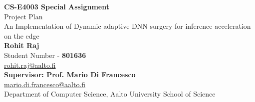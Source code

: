 \documentclass{article}
\begin{document}
	\begin{center}
    
    
		\LARGE{\textbf{CS-E4003 Special Assignment}} \\
		\Large{Project Plan} \\
        \vspace{1em}
        \Large{An Implementation of Dynamic adaptive DNN surgery for
        	inference acceleration on the edge} \\
        \vspace{1em}
        \normalsize\textbf{Rohit Raj} \\
        \normalsize{Student Number - \textbf{801636}} \\
        \normalsize{\href{mailto:rohit.raj@aalto.fi}{rohit.raj@aalto.fi}} \\
        \vspace{1em}
        \normalsize\textbf{Supervisor: Prof. Mario Di Francesco} \\
        \normalsize{\href{mailto:mario.di.francesco@aalto.fi}{mario.di.francesco@aalto.fi} } \\
        \normalsize{Department of Computer Science, Aalto University School of Science}

     
	\end{center}
\end{document}
